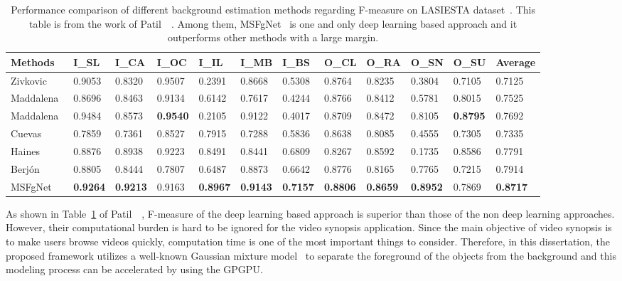 \documentclass[11pt]{hyu_thesis}
\begin{document}
\begin{table}
	\centering
	\begin{tabular}{llllllllllll}
		\hline\hline
		Methods & I\_SL & I\_CA & I\_OC & I\_IL & I\_MB & I\_BS & O\_CL & O\_RA & O\_SN & O\_SU & Average \\
		\hline\hline
		Zivkovic~\cite{Zivkovic2006} & 0.9053  & 0.8320 & 0.9507 & 0.2391 & 0.8668 & 0.5308 & 0.8764 & 0.8235 & 0.3804 & 0.7105 & 0.7125 \\
		\hline
		Maddalena~\cite{maddalena2008self} & 0.8696 & 0.8463 & 0.9134 & 0.6142 & 0.7617 & 0.4244 & 0.8766 & 0.8412 & 0.5781 & 0.8015 & 0.7525 \\
		\hline
		Maddalena~\cite{maddalena2012sobs} & 0.9484 & 0.8573 & \bfseries 0.9540 & 0.2105 & 0.9122 & 0.4017 & 0.8709 & 0.8472 & 0.8105 & \bfseries 0.8795 & 0.7692 \\
		\hline
		Cuevas~\cite{cuevas2013improved} & 0.7859 & 0.7361 & 0.8527 & 0.7915 & 0.7288 & 0.5836 & 0.8638 & 0.8085 & 0.4555 & 0.7305 & 0.7335 \\
		\hline
		Haines~\cite{haines2014background} & 0.8876 & 0.8938 & 0.9223 & 0.8491 & 0.8441 & 0.6809 & 0.8267 & 0.8592 & 0.1735 & 0.8586 & 0.7791 \\
		\hline
		Berj{\'o}n~\cite{berjon2018real} & 0.8805 & 0.8444 & 0.7807 & 0.6487 & 0.8873 & 0.6642 & 0.8776 & 0.8165 & 0.7765 & 0.7215 & 0.7914 \\
		\hline
		MSFgNet~\cite{Patil2018} & \bfseries 0.9264 & \bfseries 0.9213 & 0.9163 & \bfseries 0.8967 & \bfseries 0.9143 & \bfseries 0.7157 & \bfseries 0.8806 & \bfseries 0.8659 & \bfseries 0.8952 & 0.7869 & \bfseries 0.8717 \\
		\hline
	\end{tabular}
	\caption{Performance comparison of different background estimation methods regarding F-measure on LASIESTA dataset~\cite{cuevas2016labeled}. This table is from the work of Patil~\etal~\cite{Patil2018}. Among them, MSFgNet~\cite{Patil2018} is one and only deep learning based approach and it outperforms other methods with a large margin.}
	\label{tb:bg_fmeasure}
\end{table}
As shown in Table~\ref{tb:bg_fmeasure} of Patil~\etal~\cite{Patil2018}, F-measure of the deep learning based approach is superior than those of the non deep learning approaches. However, their computational burden is hard to be ignored for the video synopsis application. Since the main objective of video synopsis is to make users browse videos quickly, computation time is one of the most important things to consider. Therefore, in this dissertation, the proposed framework utilizes a well-known Gaussian mixture model~\cite{Zivkovic2004} to separate the foreground of the objects from the background and this modeling process can be accelerated by using the GPGPU.
\end{document}

